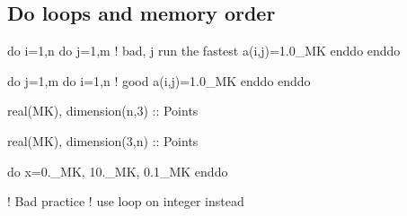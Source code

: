 \documentclass{article}
\begin{document}
\subsection{Do loops and memory order}
\label{sec:do}
\begin{codea}
do i=1,n
    do j=1,m ! bad, j run the fastest
        a(i,j)=1.0_MK
    enddo
enddo
\end{codea} 
\begin{codeb}
do j=1,m
    do i=1,n ! good
        a(i,j)=1.0_MK
    enddo
enddo
\end{codeb}
\begin{codea}
real(MK), dimension(n,3)  :: Points
\end{codea} 
\begin{codeb}
real(MK), dimension(3,n)  :: Points 
\end{codeb}
\begin{codea}
do x=0._MK, 10._MK, 0.1_MK
enddo
\end{codea} 
\begin{codeb}
! Bad practice
! use loop on integer instead
\end{codeb}



\end{document}
